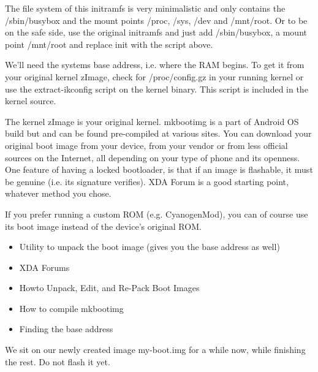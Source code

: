 The file system of this initramfs is very minimalistic and only contains the
/sbin/busybox and the mount points /proc, /sys, /dev and /mnt/root. Or to be on
the safe side, use the original initramfs and just add /sbin/busybox, a mount
point /mnt/root and replace init with the script above.

We'll need the systems base address, i.e. where the RAM begins. To get it from
your original kernel zImage, check for /proc/config.gz in your running kernel or
use the extract-ikconfig script on the kernel binary. This script is included in
the kernel source.


The kernel zImage is your original kernel. mkbootimg is a part of Android OS
build but and can be found pre-compiled at various sites. You can download your
original boot image from your device, from your vendor or from less official
sources on the Internet, all depending on your type of phone and its openness.
One feature of having a locked bootloader, is that if an image is flashable, it
must be genuine (i.e. its signature verifies). XDA Forum is a good starting
point, whatever method you chose.

If you prefer running a custom ROM (e.g. CyanogenMod), you can of course use its
boot image instead of the device's original ROM.

\begin{itemize}
  \item 
Utility to unpack the boot image (gives you the base address as well)
  \item 
XDA Forums
  \item 
Howto Unpack, Edit, and Re-Pack Boot Images
  \item 
How to compile mkbootimg
  \item 
Finding the base address
\end{itemize}

We sit on our newly created image my-boot.img for a while now, while finishing
the rest. Do not flash it yet.

